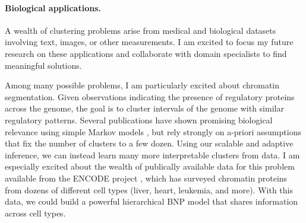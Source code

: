 \documentclass[11pt,letterpaper,sans]{article}
\begin{document}
\paragraph{Biological applications.}
A wealth of clustering problems arise from medical and biological datasets involving text, images, or other measurements. I am excited to focus my future research on these applications and collaborate with domain specialists to find meaningful solutions.

Among many possible problems, I am particularly excited about chromatin segmentation. Given observations indicating the presence of regulatory proteins across the genome, the goal is to cluster intervals of the genome with similar regulatory patterns. Several publications have shown promising biological relevance using simple Markov models \cite{ernst2010discovery,ernst2012chromhmm}, but rely strongly on a-priori assumptions that fix the number of clusters to a few dozen. Using our scalable and adaptive inference, we can instead learn many more interpretable clusters from data. 
I am especially excited about the wealth of publically available data for this problem available from the ENCODE project \cite{hoffman2012integrative}, which has surveyed chromatin proteins from dozens of different cell types (liver, heart, leukemia, and more). With this data, we could build a powerful hierarchical BNP model that shares information across cell types.

\newpage


\end{document}
